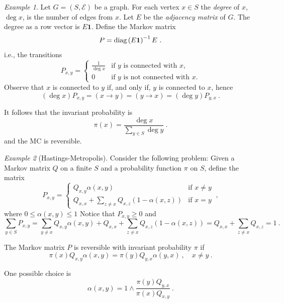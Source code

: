 \documentclass[12pt,a4paper]{amsart}
\newcommand{\one}{\bm 1}
\theoremstyle{plain}%
\theoremstyle{definition}
\theoremstyle{remark}
\newtheorem{example}{Example}
\begin{document}
\begin{example}
Let $G = (S,\mathcal E)$ be a graph. For each vertex $x \in S$ the \emph{degree} of $x$, $\deg x$, is the number of edges from $x$. Let $E$ be the \emph{adjacency matrix} of $G$. The degree as a row vector is $E \one$. Define the Markov matrix
\begin{equation*}
  P = \diagof{E \one}^{-1} E \ . 
\end{equation*}
i.e., the transitions
\begin{equation*}
 P_{x,y} = \begin{cases}
   \frac 1 {\deg x} & \text{if $y$ is connected with $x$,} \\
   0 & \text{if $y$ is not connected with $x$.}
  \end{cases}
\end{equation*}
Observe that $x$ is connected to $y$ if, and only if, $y$ is connected to $x$, hence
\begin{equation*}
  (\deg x) P_{x,y} = (x \to y) = (y \to x) = (\deg y) P_{y,x} \ .
\end{equation*}

It follows that the invariant probability is
\begin{equation*}
  \pi(x) = \frac{\deg x}{\sum_{y \in S} \deg y} \ .
\end{equation*}
and the MC is reversible.
\end{example}

\begin{example}[Hastings-Metropolis]
Consider the following problem: Given a Markov matrix $Q$ on a finite $S$ and a probability function $\pi$ on $S$, define the matrix
\begin{equation*}
  P_{x,y} =
  \begin{cases}
    Q_{x,y}\alpha(x,y) & \text{if $x \neq y$} \\
    Q_{x,x} + \sum_{z \neq x} Q_{x,z}(1 - \alpha(x,z)) & \text{if $x=y$}
  \end{cases} \ ,
\end{equation*}
where $0 \leq \alpha(x,y) \leq 1$
Notice that $P_{x,y} \ge 0$ and 
\begin{equation*}
  \sum_{y \in S} P_{x,y} = \sum_{y \neq x} Q_{x,y}\alpha(x,y) + Q_{x,x} + \sum_{z \neq x} Q_{x,z}(1 - \alpha(x,z))  = Q_{x,x} + \sum_{z \neq x} Q_{x,z} = 1 \ .
\end{equation*}

The Markov matrix $P$ is reversible with invariant probability $\pi$ if
\begin{equation*}
  \pi(x) Q_{x,y} \alpha(x,y) = \pi(y) Q_{y,x} \alpha(y,x) \ , \quad x \neq y \ . 
\end{equation*}

One possible choice is
\begin{equation*}
  \alpha(x,y) = 1 \wedge \frac{\pi(y)Q_{y,x}}{\pi(x)Q_{x,y}} \ .
\end{equation*}
\end{example}

%

\end{document}
